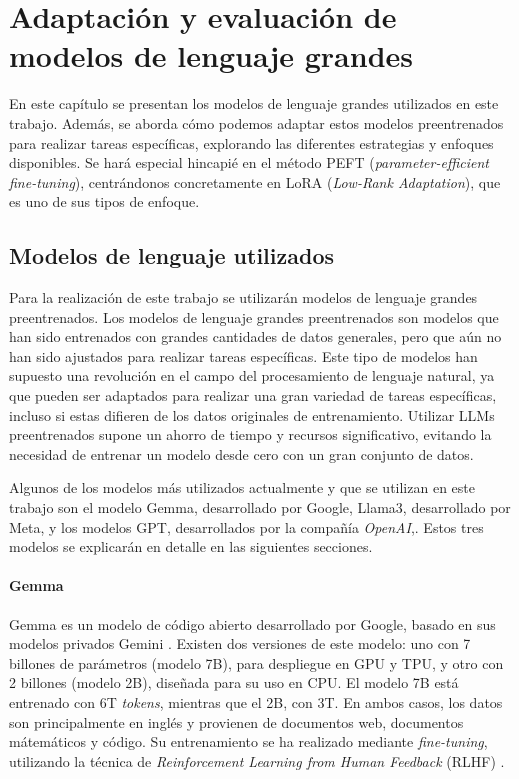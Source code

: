 \documentclass[11pt,spanish,listoffigures,listoftables]{tfgetsinf}
\begin{document}
\chapter{Adaptación y evaluación de modelos de lenguaje grandes} \label{cap3}

En este capítulo se presentan los modelos de lenguaje grandes utilizados en este trabajo. Además, se aborda cómo podemos adaptar estos modelos preentrenados para realizar tareas  específicas, explorando las diferentes estrategias y enfoques disponibles. Se hará especial hincapié en el método PEFT  (\textit{parameter-efficient fine-tuning}), centrándonos concretamente en LoRA (\textit{Low-Rank Adaptation}), que es uno de sus tipos de enfoque.

\section{Modelos de lenguaje utilizados} \label{modelosUtilizados}

Para la realización de este trabajo se utilizarán modelos de lenguaje grandes preentrenados. Los modelos de lenguaje grandes preentrenados son modelos que han sido entrenados con grandes cantidades de datos generales, pero que aún no han sido ajustados para realizar tareas específicas. Este tipo de modelos han supuesto una revolución en el campo del procesamiento de lenguaje natural, ya que pueden ser adaptados para realizar una gran variedad de tareas específicas, incluso si estas difieren de los datos originales de entrenamiento. Utilizar LLMs preentrenados supone un ahorro de tiempo y recursos significativo, evitando la necesidad de entrenar un modelo desde cero con un gran conjunto de datos.

Algunos de los modelos más utilizados actualmente y que se utilizan en este trabajo son el modelo Gemma, desarrollado por Google, Llama3, desarrollado por Meta, y los modelos GPT, desarrollados por la compañía \textit{OpenAI},. Estos tres modelos se explicarán en detalle en las siguientes secciones.

\subsubsection{Gemma}

Gemma \cite{gemmateam2024gemmaopenmodelsbased} es un modelo de código abierto desarrollado por Google, basado en sus modelos privados Gemini \cite{geminiteam2024geminifamilyhighlycapable}. Existen dos versiones de este modelo: uno con 7 billones de parámetros (modelo 7B), para despliegue en GPU y TPU, y otro con 2 billones (modelo 2B), diseñada para su uso en CPU. El modelo 7B está entrenado con 6T \textit {tokens}, mientras que el 2B, con 3T. En ambos casos, los datos son principalmente en inglés y provienen de documentos web, documentos mátemáticos y código. Su entrenamiento se ha realizado mediante \textit{fine-tuning}, utilizando la técnica de  \textit{Reinforcement Learning from Human Feedback} (RLHF) \cite{christiano2023deepreinforcementlearninghuman}.
\end{document}

